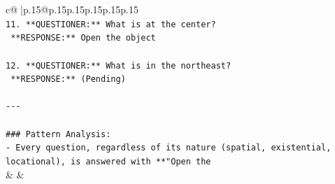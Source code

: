 \documentclass{article}
\begin{document}
{\begin{supertabular}{c@{$\;$}|p{.15\linewidth}@{}p{.15\linewidth}p{.15\linewidth}p{.15\linewidth}p{.15\linewidth}p{.15\linewidth}}
{{{\\ 
\texttt{11. **QUESTIONER:** What is at the center?  } \\
\texttt{    **RESPONSE:** Open the object} \\
\\ 
\texttt{12. **QUESTIONER:** What is in the northeast?  } \\
\texttt{    **RESPONSE:** (Pending)} \\
\\ 
\texttt{{-}{-}{-}} \\
\\ 
\texttt{\#\#\# Pattern Analysis:} \\
\texttt{{-} Every question, regardless of its nature (spatial, existential, locational), is answered with **"Open the} \\
            }
        }
    }
    & & \\ \\


\end{supertabular}}
\end{document}
